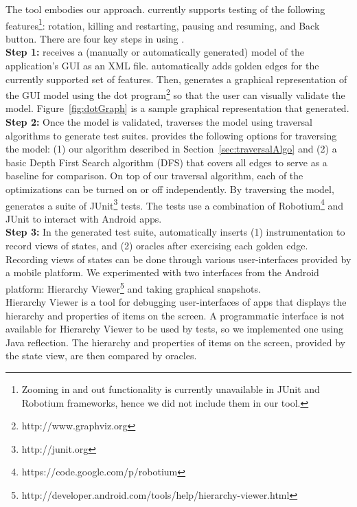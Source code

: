 
The \tool{} tool embodies our approach.  \tool{} currently supports
testing of the following features\footnote{Zooming in and out
  functionality is currently unavailable in JUnit and Robotium
  frameworks, hence we did not include them in our tool.}: rotation,
killing and restarting, pausing and resuming, and Back button.
{}
There are four key steps in using \tool.
\\
\indent
{\bf Step 1:} \tool{} receives a (manually or automatically generated)
model of the application's GUI as an XML file. \tool{} automatically
adds golden edges for the currently supported set of features.
Then, \tool{} generates a graphical representation of the GUI
model using the dot program\footnote{http://www.graphviz.org} so that
the user can visually validate the model. Figure~\ref{fig:dotGraph} is
a sample graphical representation that \tool{} generated.
\\
\indent
{\bf Step 2:}
Once the model is validated, \tool{} traverses the model using traversal algorithms to generate test suites. \tool{} provides the following options for traversing the model: (1) our algorithm described in Section~\ref{sec:traversalAlgo} and (2) a basic Depth First Search algorithm (DFS) that covers all edges to serve as a baseline for comparison. On top of our traversal algorithm, each of the optimizations can be turned on or off independently. By traversing the model, \tool{} generates a suite of JUnit\footnote{http://junit.org} tests. The tests use a combination of Robotium\footnote{https://code.google.com/p/robotium} and JUnit to interact with Android apps.
\\
\indent
{\bf Step 3:}
In the generated test suite, \tool{} automatically inserts (1) instrumentation to record views of states, and (2) oracles after exercising each golden edge.
Recording views of states can be done through various user-interfaces provided by a mobile platform. We experimented with two interfaces from the Android platform: Hierarchy Viewer\footnote{http://developer.android.com/tools/help/hierarchy-viewer.html} and taking graphical snapshots.
\\
\indent
Hierarchy Viewer is a tool for debugging user-interfaces of apps that displays the hierarchy and properties of items on the screen.
A programmatic interface is not available for Hierarchy Viewer to be used by tests, so we implemented one using Java reflection. The hierarchy and properties of items on the screen, provided by the state view, are then compared by oracles.
